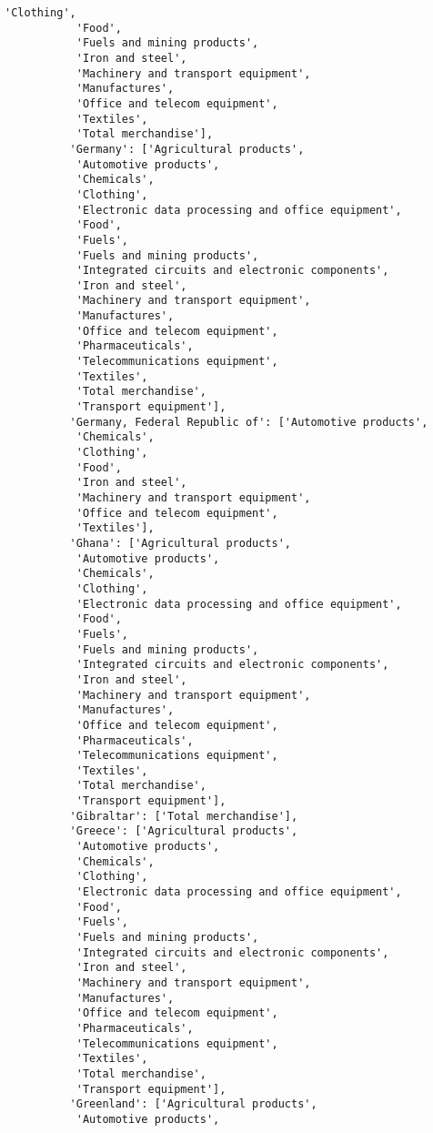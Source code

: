 \documentclass[11pt]{article}
\begin{document}
\begin{Verbatim}[commandchars=\\\{\}]
           'Clothing',
           'Food',
           'Fuels and mining products',
           'Iron and steel',
           'Machinery and transport equipment',
           'Manufactures',
           'Office and telecom equipment',
           'Textiles',
           'Total merchandise'],
          'Germany': ['Agricultural products',
           'Automotive products',
           'Chemicals',
           'Clothing',
           'Electronic data processing and office equipment',
           'Food',
           'Fuels',
           'Fuels and mining products',
           'Integrated circuits and electronic components',
           'Iron and steel',
           'Machinery and transport equipment',
           'Manufactures',
           'Office and telecom equipment',
           'Pharmaceuticals',
           'Telecommunications equipment',
           'Textiles',
           'Total merchandise',
           'Transport equipment'],
          'Germany, Federal Republic of': ['Automotive products',
           'Chemicals',
           'Clothing',
           'Food',
           'Iron and steel',
           'Machinery and transport equipment',
           'Office and telecom equipment',
           'Textiles'],
          'Ghana': ['Agricultural products',
           'Automotive products',
           'Chemicals',
           'Clothing',
           'Electronic data processing and office equipment',
           'Food',
           'Fuels',
           'Fuels and mining products',
           'Integrated circuits and electronic components',
           'Iron and steel',
           'Machinery and transport equipment',
           'Manufactures',
           'Office and telecom equipment',
           'Pharmaceuticals',
           'Telecommunications equipment',
           'Textiles',
           'Total merchandise',
           'Transport equipment'],
          'Gibraltar': ['Total merchandise'],
          'Greece': ['Agricultural products',
           'Automotive products',
           'Chemicals',
           'Clothing',
           'Electronic data processing and office equipment',
           'Food',
           'Fuels',
           'Fuels and mining products',
           'Integrated circuits and electronic components',
           'Iron and steel',
           'Machinery and transport equipment',
           'Manufactures',
           'Office and telecom equipment',
           'Pharmaceuticals',
           'Telecommunications equipment',
           'Textiles',
           'Total merchandise',
           'Transport equipment'],
          'Greenland': ['Agricultural products',
           'Automotive products',

\end{Verbatim}
\end{document}
